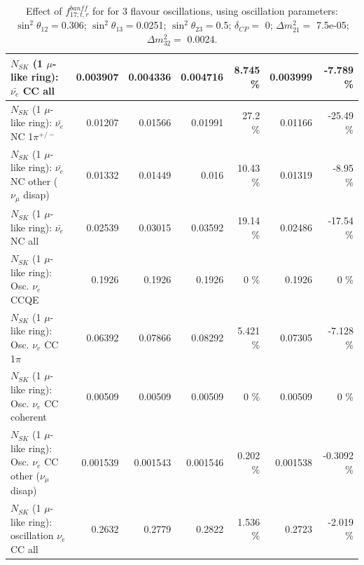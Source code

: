 \begin{table}
\begin{tabular}{| l | r | r | r  r | r  r |}
                            $N_{SK}$ (1 $\mu$-like ring): $\bar{\nu_{e}}$ CC all &        0.003907 &        0.004336 &        0.004716 &    8.745 \%  &        0.003999 &   -7.789 \%  \\ 
\hline
                     $N_{SK}$ (1 $\mu$-like ring): $\bar{\nu_e}$ NC 1$\pi^{+/-}$ &         0.01207 &         0.01566 &         0.01991 &     27.2 \%  &         0.01166 &   -25.49 \%  \\ 
          $N_{SK}$ (1 $\mu$-like ring): $\bar{\nu_e}$ NC other ($\nu_\mu$ disap) &         0.01332 &         0.01449 &           0.016 &    10.43 \%  &         0.01319 &    -8.95 \%  \\ 
                            $N_{SK}$ (1 $\mu$-like ring): $\bar{\nu_{e}}$ NC all &         0.02539 &         0.03015 &         0.03592 &    19.14 \%  &         0.02486 &   -17.54 \%  \\ 
\hline
\hline
\hline
                                 $N_{SK}$ (1 $\mu$-like ring): Osc. $\nu_e$ CCQE &          0.1926 &          0.1926 &          0.1926 &        0 \%  &          0.1926 &        0 \%  \\ 
                            $N_{SK}$ (1 $\mu$-like ring): Osc. $\nu_e$ CC 1$\pi$ &         0.06392 &         0.07866 &         0.08292 &    5.421 \%  &         0.07305 &   -7.128 \%  \\ 
                          $N_{SK}$ (1 $\mu$-like ring): Osc. $\nu_e$ CC coherent &         0.00509 &         0.00509 &         0.00509 &        0 \%  &         0.00509 &        0 \%  \\ 
           $N_{SK}$ (1 $\mu$-like ring): Osc. $\nu_e$ CC other ($\nu_\mu$ disap) &        0.001539 &        0.001543 &        0.001546 &    0.202 \%  &        0.001538 &  -0.3092 \%  \\ 
                        $N_{SK}$ (1 $\mu$-like ring): oscillation $\nu_e$ CC all &          0.2632 &          0.2779 &          0.2822 &    1.536 \%  &          0.2723 &   -2.019 \%  \\ 
\hline
\hline
\end{tabular}
\caption{ Effect of $f_{17; t, r}^{banff}$ for for 3 flavour oscillations, using oscillation parameters:  $\sin^2\theta_{12} = $0.306; $\sin^2\theta_{13} = $0.0251; $\sin^2\theta_{23} = $0.5; $\delta_{CP} = $        0; $\Delta m^2_{21} = $    7.5e-05; $\Delta m^2_{32} = $    0.0024. }
\label{tab:num_banff_mares_1RmuT_3f_osc_t13:0.0251}
\end{table}
\clearpage
